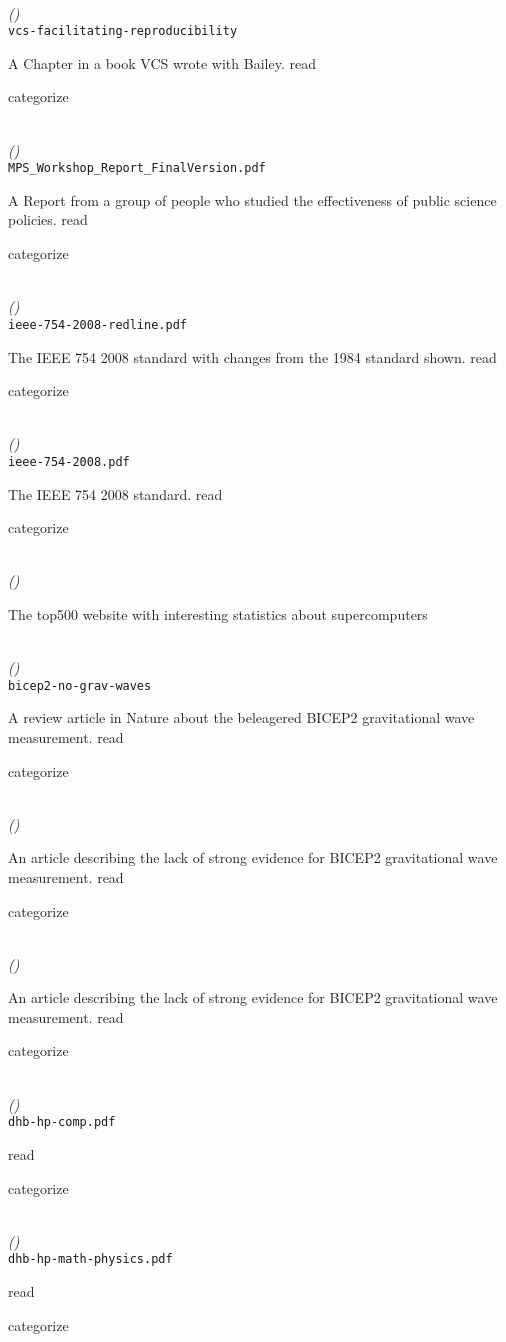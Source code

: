 \documentclass{article}
\newcommand{\Read}{
	\gls{read}
}
\newcommand{\categorize}{
	\gls{categorize}
}
\newenvironment{refdef}[2] {
	\noindent \textbf{\citetitle{#1}} \cite{#1}\\ \citejournalorbooktitle{#1} \textit{(\citeyear{#1})}\\ \texttt{#2} \vspace{0.2in} \par 
} {
\vspace{0.2in}
}
\begin{document}
\begin{refdef}{vcs-facilitating-reproducibility}{vcs-facilitating-reproducibility}
A Chapter in a book VCS wrote with Bailey. \Read \categorize
\end{refdef}

\begin{refdef}{mps-report-2016}{MPS\_Workshop\_Report\_FinalVersion.pdf}
A Report from a group of people who studied the effectiveness of public science policies. \Read \categorize
\end{refdef}

\begin{refdef}{ieee-754-2008-redline}{ieee-754-2008-redline.pdf}
The IEEE 754 2008 standard with changes from the 1984 standard shown. \Read \categorize
\end{refdef}

\begin{refdef}{ieee-754-2008}{ieee-754-2008.pdf}
The IEEE 754 2008 standard. \Read \categorize
\end{refdef}

\begin{refdef}{top-500-perfdev}{}
The top500 website with interesting statistics about supercomputers
\end{refdef}

\begin{refdef}{bicep2-no-grav-waves}{bicep2-no-grav-waves}
A review article in Nature about the beleagered BICEP2 gravitational wave measurement. \Read \categorize
\end{refdef}

\begin{refdef}{bicep2-grav-wave-scrutiny-1}{}
An article describing the lack of strong evidence for BICEP2 gravitational wave measurement. \Read \categorize
\end{refdef}

\begin{refdef}{bicep2-grav-wave-scrutiny-2}{}
An article describing the lack of strong evidence for BICEP2 gravitational wave measurement. \Read \categorize
\end{refdef}

\begin{refdef}{dhb-hp-comp}{dhb-hp-comp.pdf}
\Read \categorize
\end{refdef}

\begin{refdef}{dhb-hp-math-physics}{dhb-hp-math-physics.pdf}
\Read \categorize
\end{refdef}
\end{document}
